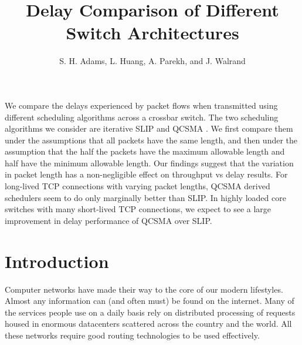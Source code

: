 \documentclass[11pt]{article}%
\begin{document}
\title{Delay Comparison of Different Switch Architectures}



\author{S. H. Adams, L. Huang, A. Parekh, and J. Walrand }%






\maketitle

{\abstract
 We compare the delays experienced by packet flows when transmitted using different scheduling algorithms across a crossbar switch.  The two scheduling algorithms we consider are iterative SLIP \cite{McKeown} and QCSMA \cite{Libin}.  We first compare them under the assumptions that all packets have the same length, and then under the assumption that the half the packets have the maximum allowable length and half have the minimum allowable length.  Our findings suggest that the variation in packet length has a non-negligible effect on throughput vs delay results.  For long-lived TCP connections with varying packet lengths, QCSMA derived schedulers seem to do only marginally better than SLIP.  In highly loaded core switches with many short-lived TCP connections, we expect to see a large improvement in delay performance of QCSMA over SLIP.}

\section{Introduction}
Computer networks have made their way to the core of our modern lifestyles.  Almost any information can (and often must) be found on the internet.  Many of the services people use on a daily basis rely on distributed processing of requests housed in enormous datacenters scattered across the country and the world.  All these networks require good routing technologies to be used effectively.
\end{document}
